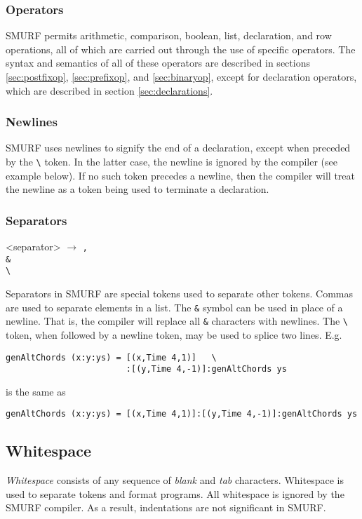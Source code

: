 \subsubsection{Operators}
SMURF permits arithmetic, comparison, boolean, list, declaration, and row operations, all of which
are carried out through the use of specific operators. The syntax and semantics of all of these
operators are described in sections \ref{sec:postfixop}, \ref{sec:prefixop}, and \ref{sec:binaryop},
except for declaration operators, which are described in section \ref{sec:declarations}.


\subsubsection{Newlines}
SMURF uses newlines to signify the end of a declaration, except
when preceded by the \texttt{\textbackslash} token. In the latter case, the newline is ignored by the compiler 
(see example below). If no such token precedes a newline, then the compiler will treat the newline as
a token being used to terminate a declaration.

\subsubsection{Separators}

\begin{grammar}
<separator> $\rightarrow$ \texttt{,} \\
												  \texttt{\&} \\
													\texttt{\textbackslash}
\end{grammar}

Separators in SMURF are special tokens used to separate other tokens. 
Commas are used to separate elements in a list.
The \texttt{\&} symbol can be used in place of a newline. That is, the compiler
will replace all \texttt{\&} characters with newlines. The
\texttt{\textbackslash} token, when followed by a newline token,
may be used to splice two lines. E.g.
\begin{lstlisting}
genAltChords (x:y:ys) = [(x,Time 4,1)]   \
                        :[(y,Time 4,-1)]:genAltChords ys
\end{lstlisting}
is the same as 
\begin{lstlisting}
genAltChords (x:y:ys) = [(x,Time 4,1)]:[(y,Time 4,-1)]:genAltChords ys
\end{lstlisting}


\subsection{Whitespace}
\label{sec:whitespaces}
{\it Whitespace} consists of any sequence of {\it blank} and {\it tab} characters.
Whitespace is used to
separate tokens and format programs. All whitespace is ignored by the
SMURF compiler. As a result, indentations are not significant in SMURF.

